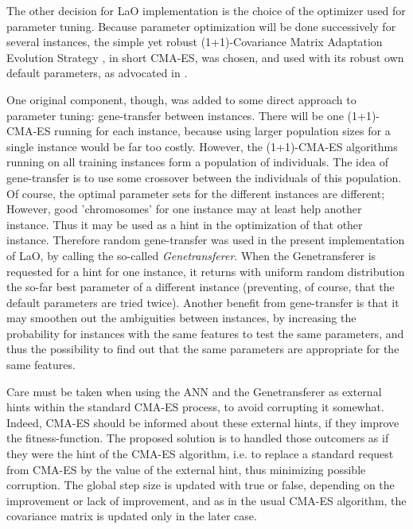 \documentclass[letterpaper]{article}
\begin{document}
The other decision for LaO implementation is the choice of the optimizer used for parameter tuning. Because parameter optimization will be done successively for several instances, the simple yet robust (1+1)-Covariance Matrix Adaptation Evolution Strategy \cite{hansen2001ecj}, in short CMA-ES,  was chosen, and used with its robust own default parameters, as advocated in \cite{BibGECCO:2010}.

One original component, though, was added to some direct approach to parameter tuning: gene-transfer between instances. There will be one (1+1)-CMA-ES running for each instance, because using larger population sizes for a single instance would be far too costly. However, the (1+1)-CMA-ES algorithms running on all training instances form a population of individuals. The idea of gene-transfer is to use some crossover between the individuals of this population. Of course, the optimal parameter sets for the different instances are different; However, good 'chromosomes' for one instance may at least help another instance. Thus it may be used as a hint in the optimization of that other instance. Therefore random gene-transfer was used in the present implementation of LaO, by calling the so-called {\em Genetransferer}. When the Genetransferer is requested for a hint for one instance, it returns with uniform random distribution the so-far best parameter of a different instance (preventing, of course, that the default parameters are tried twice). Another benefit from gene-transfer is that it may smoothen out the ambiguities between instances, by increasing the probability for instances with the same features to test the same parameters, and thus the possibility to find out that the same parameters are appropriate for the same features.

Care must be taken when using the ANN and the Genetransferer as external hints within the standard CMA-ES process, to avoid corrupting it somewhat. Indeed, CMA-ES should be informed about these external hints, if they improve the fitness-function. The proposed solution is to handled those outcomers as if they were the hint of the CMA-ES algorithm, i.e. to replace a standard request from CMA-ES by the value of the external hint, thus minimizing possible corruption. The global step size is updated with true or false, depending on the improvement or lack of improvement, and as in the usual CMA-ES algorithm, the covariance matrix is updated only in the later case.
\end{document}
